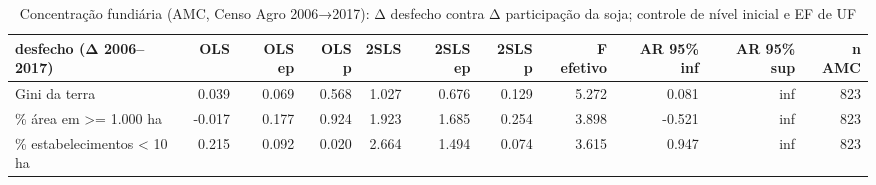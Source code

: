 \begin{table}
\caption{Concentração fundiária (AMC, Censo Agro 2006→2017): Δ desfecho contra Δ participação da soja; controle de nível inicial e EF de UF}
\label{tab:s08_heterog_fundiaria}
\begin{tabular}{lrrrrrrrrrr}
\toprule
desfecho (Δ 2006–2017) & OLS & OLS ep & OLS p & 2SLS & 2SLS ep & 2SLS p & F efetivo & AR 95\% inf & AR 95\% sup & n AMC \\
\midrule
Gini da terra & 0.039 & 0.069 & 0.568 & 1.027 & 0.676 & 0.129 & 5.272 & 0.081 & inf & 823 \\
\% área em >= 1.000 ha & -0.017 & 0.177 & 0.924 & 1.923 & 1.685 & 0.254 & 3.898 & -0.521 & inf & 823 \\
\% estabelecimentos < 10 ha & 0.215 & 0.092 & 0.020 & 2.664 & 1.494 & 0.074 & 3.615 & 0.947 & inf & 823 \\
\bottomrule
\end{tabular}
\end{table}
